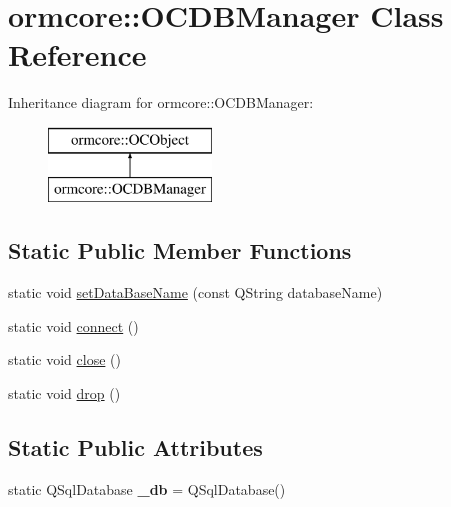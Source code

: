 \hypertarget{classormcore_1_1_o_c_d_b_manager}{
\section{ormcore\-:\-:\-O\-C\-D\-B\-Manager \-Class \-Reference}
\label{classormcore_1_1_o_c_d_b_manager}
}
\-Inheritance diagram for ormcore\-:\-:\-O\-C\-D\-B\-Manager\-:\begin{figure}[H]
\begin{center}
\leavevmode
\includegraphics[height=2.000000cm]{classormcore_1_1_o_c_d_b_manager}
\end{center}
\end{figure}
\subsection*{\-Static \-Public \-Member \-Functions}
\begin{DoxyCompactItemize}
\item 
static void \hyperlink{classormcore_1_1_o_c_d_b_manager_a30fc8cd88de7ff50e1d0c3fd3be99451}{set\-Data\-Base\-Name} (const \-Q\-String database\-Name)
\item 
static void \hyperlink{classormcore_1_1_o_c_d_b_manager_a5c5f905f5b91f9018d4fbd047e5aaa93}{connect} ()
\item 
static void \hyperlink{classormcore_1_1_o_c_d_b_manager_ac1425506ca2714cf62528bf48e4e372b}{close} ()
\item 
static void \hyperlink{classormcore_1_1_o_c_d_b_manager_a6482ce90b6c3f937f3e5aec74173cade}{drop} ()
\end{DoxyCompactItemize}
\subsection*{\-Static \-Public \-Attributes}
\begin{DoxyCompactItemize}
\item 
\hypertarget{classormcore_1_1_o_c_d_b_manager_ae8f27a1a41d27e0cfc4ba5bea99811e5}{
static \-Q\-Sql\-Database {\bfseries \-\_\-db} = \-Q\-Sql\-Database()}
\label{classormcore_1_1_o_c_d_b_manager_ae8f27a1a41d27e0cfc4ba5bea99811e5}

\end{DoxyCompactItemize}


